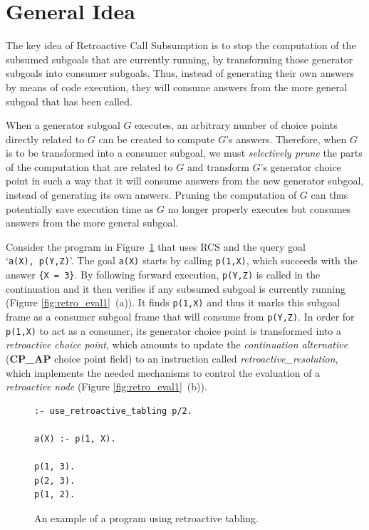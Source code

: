 \section{General Idea}

The key idea of Retroactive Call Subsumption is to stop the computation of the subsumed subgoals
that are currently running, by transforming those generator subgoals into consumer subgoals. Thus, instead
of generating their own answers by means of code execution, they will consume answers from the more general
subgoal that has been called.

When a generator subgoal $G$ executes, an arbitrary number of choice points directly related to $G$
can be created to compute $G$'s answers. Therefore, when $G$ is to be
transformed into a consumer subgoal, we must \textit{selectively prune} the parts of the computation
that are related to $G$ and transform $G$'s generator choice point in such a way that it
will consume answers from the new generator subgoal, instead of generating its own answers.
Pruning the computation of $G$ can thus potentially save execution time as $G$ no longer properly executes
but consumes answers from the more general subgoal.

Consider the program in Figure~\ref{fig:retro_program1} that uses RCS and the query goal `\texttt{a(X),~p(Y,Z)}'.
The goal \texttt{a(X)} starts by calling \texttt{p(1,X)}, which succeeds with the answer \texttt{\{X~=~3\}}.
By following forward execution, \texttt{p(Y,Z)} is called in the continuation and it then verifies if any subsumed
subgoal is currently running (Figure \ref{fig:retro_eval1}~(a)). It finds \texttt{p(1,X)} and thus it marks this
subgoal frame as a consumer subgoal frame that will consume from \texttt{p(Y,Z)}.
In order for \texttt{p(1,X)} to act as a consumer, its generator choice point is transformed into
a \textit{retroactive choice point}, which amounts to update the \textit{continuation alternative}
(\textbf{CP\_AP} choice point field) to an instruction called \textit{retroactive\_resolution},
which implements the needed mechanisms to control the evaluation of a \textit{retroactive node}
(Figure \ref{fig:retro_eval1}~(b)).

\begin{figure}[ht]
\begin{Verbatim}
:- use_retroactive_tabling p/2.

a(X) :- p(1, X).

p(1, 3).
p(2, 3).
p(1, 2).
\end{Verbatim}
\caption{An example of a program using retroactive tabling.}
\label{fig:retro_program1}
\end{figure}

